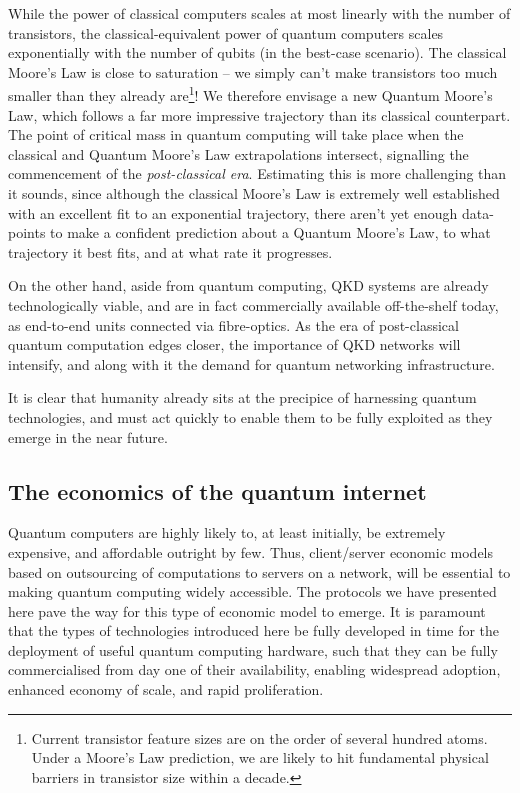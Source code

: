 \documentclass[aps, rmp, twocolumn, amsmath, amssymb, nofootinbib, superscriptaddress, longbibliography, floatfix, table-of-contents, eqsecnum]{revtex4-1}
\newcommand{\comment}[1]{{\color{blue}{\textbf{#1}}}}
\begin{document}
While the power of classical computers scales at most linearly with the number of transistors, the classical-equivalent power of quantum computers scales exponentially with the number of qubits (in the best-case scenario). The classical Moore's Law is close to saturation -- we simply can't make transistors too much smaller than they already are\footnote{Current transistor feature sizes are on the order of several hundred atoms. Under a Moore's Law prediction, we are likely to hit fundamental physical barriers in transistor size within a decade.}! We therefore envisage a new Quantum Moore's Law, which follows a far more impressive trajectory than its classical counterpart. The point of critical mass in quantum computing will take place when the classical and Quantum Moore's Law extrapolations intersect, signalling the commencement of the \textit{post-classical era}. Estimating this is more challenging than it sounds, since although the classical Moore's Law is extremely well established with an excellent fit to an exponential trajectory, there aren't yet enough data-points to make a confident prediction about a Quantum Moore's Law, to what trajectory it best fits, and at what rate it progresses.

On the other hand, aside from quantum computing, QKD systems are already technologically viable, and are in fact commercially available off-the-shelf today, as end-to-end units connected via fibre-optics. As the era of post-classical quantum computation edges closer, the importance of QKD networks will intensify, and along with it the demand for quantum networking infrastructure.

It is clear that humanity already sits at the precipice of harnessing quantum technologies, and must act quickly to enable them to be fully exploited as they emerge in the near future.

%
%

\subsection{The economics of the quantum internet} \label{sec:economics} 

\comment{Add discussion of global virtual QC and quantum singularity!}

Quantum computers are highly likely to, at least initially, be extremely expensive, and affordable outright by few. Thus, client/server economic models based on outsourcing of computations to servers on a network, will be essential to making quantum computing widely accessible. The protocols we have presented here pave the way for this type of economic model to emerge. It is paramount that the types of technologies introduced here be fully developed in time for the deployment of useful quantum computing hardware, such that they can be fully commercialised from day one of their availability, enabling widespread adoption, enhanced economy of scale, and rapid proliferation.
\end{document}
